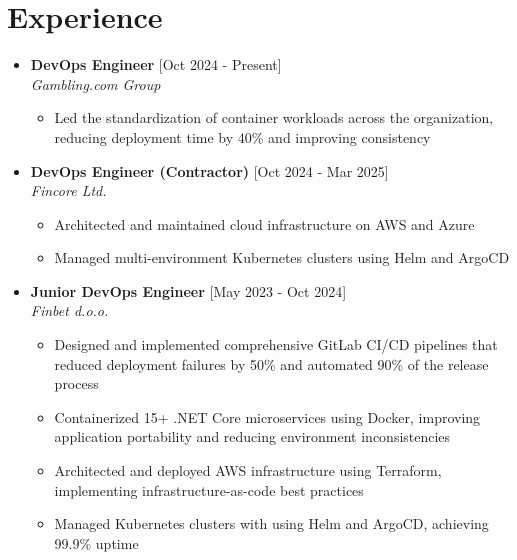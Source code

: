 \documentclass[12pt,a4paper]{moderncv}
\begin{document}
\makecvtitle

\vspace{-0.8em}
\section{Experience}

\begin{itemize}
	\item \textbf{DevOps Engineer} \hfill [Oct 2024 - Present]\\
	\textit{Gambling.com Group}

	\begin{itemize}
		\vspace{-0.75em}
		\setlength\itemsep{0.1em}
		\item Led the standardization of container workloads across the organization, reducing deployment time by 40\% and improving consistency
	\end{itemize}

	\item \textbf{DevOps Engineer (Contractor)} \hfill [Oct 2024 - Mar 2025]\\
	\textit{Fincore Ltd.}

	\begin{itemize}
		\vspace{-0.75em}
		\setlength\itemsep{0.1em}
		\item Architected and maintained cloud infrastructure on AWS and Azure
		\item Managed multi-environment Kubernetes clusters using Helm and ArgoCD
	\end{itemize}

	\item \textbf{Junior DevOps Engineer} \hfill [May 2023 - Oct 2024]\\
	\textit{Finbet d.o.o.}

	\begin{itemize}
		\vspace{-0.75em}
		\setlength\itemsep{0.1em}
		\item Designed and implemented comprehensive GitLab CI/CD pipelines that reduced deployment failures by 50\% and automated 90\% of the release process
		\item Containerized 15+ .NET Core microservices using Docker, improving application portability and reducing environment inconsistencies
		\item Architected and deployed AWS infrastructure using Terraform, implementing infrastructure-as-code best practices
		\item Managed Kubernetes clusters with using Helm and ArgoCD, achieving 99.9\% uptime
	\end{itemize}

\end{itemize}	
\end{document}
